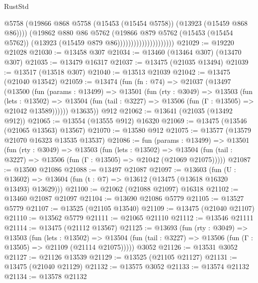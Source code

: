 \begin{lexlean}{RustStd}
\begin{coremodule}
                                        @5758
                                        (@19866
                                          @868
                                          @5758
                                          (@15453 (@15454 @5758))
                                          (@13923 (@15459 @868 @86))))
                                      (@19862
                                        @880
                                        @86
                                        @5762
                                        (@19866
                                          @879
                                          @5762
                                          (@15453 (@15454 @5762))
                                          (@13923 (@15459 @879 @86)))))))))))))))))))))
@21029 := @19220 @21028
@21030 := @13458 @307
@21034 := @13460 (@13464 @307) (@13470 @307)
@21035 := @13479 @16317
@21037 := @13475 (@21035 @13494)
@21039 := @13517 (@13518 @307)
@21040 := @13513 @21039
@21042 := @13475 (@21040 @13542)
@21059 := @13474
    (fun (fn : @74) =>
    @21037
      (@13497
        (@13500
          (fun (params : @13499) =>
          @13501
            (fun (rty : @3049) =>
            @13503
              (fun (lets : @13502) =>
              @13504 (fun (tail : @3227) => @13506 (fun (Γ : @13505) => @21042 @13589))))))
        @13635))
    @912
@21062 := @13641 (@21035 (@13492 @912))
@21065 := @13554 (@13555 @912) @16320
@21069 := @13475 (@13546 (@21065 @13563) @13567)
@21070 := @13580 @912
@21075 := @13577 (@13579 @21070 @16323 @13535 @13537)
@21086 := fun (params : @13499) =>
  @13501
    (fun (rty : @3049) =>
    @13503
      (fun (lets : @13502) =>
      @13504 (fun (tail : @3227) => @13506 (fun (Γ : @13505) => @21042 (@21069 @21075)))))
@21087 := @13500 @21086
@21088 := @13497 @21087
@21097 := @13603
    (fun (U : @13602) => @13604 (fun (t : @7) => @13612 (@13475 (@13618 @16320 @13493) @13629)))
@21100 := @21062 (@21088 @21097) @16318
@21102 := @13460 @21087 @21097
@21104 := @13690 @21086 @5779
@21105 := @13527 @5779
@21107 := @13525 (@21105 @13540)
@21109 := @13475 (@21040 @21107)
@21110 := @13562 @5779
@21111 := @21065 @21110
@21112 := @13546 @21111
@21114 := @13475 (@21112 @13567)
@21125 := @13693
    (fun (rty : @3049) =>
    @13503
      (fun (lets : @13502) =>
      @13504 (fun (tail : @3227) => @13506 (fun (Γ : @13505) => @21109 (@21114 @21075)))))
    @3052
@21126 := @13531 @3052
@21127 := @21126 @13539
@21129 := @13525 (@21105 @21127)
@21131 := @13475 (@21040 @21129)
@21132 := @13575 @3052
@21133 := @13574 @21132
@21134 := @13578 @21132

\end{coremodule}
\end{lexlean}
